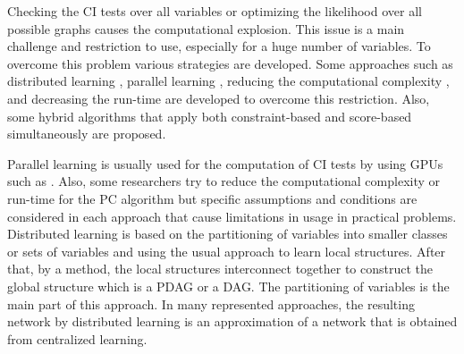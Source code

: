 \documentclass{article}
\newcommand{\Oo}{\mathcal{O}}
\begin{document}
Checking the CI tests over all variables or optimizing the likelihood over all possible graphs causes the computational explosion\cite{2000spirtes}.
This issue is a main challenge and restriction to use, especially for a huge number of variables\cite{2017Janzhing,2017million}.
To overcome this problem various strategies are developed.
Some approaches such as distributed learning \cite{2006Hierarchical,2020PEFdistributed, 2015Classifier}, parallel learning \cite{2019saleh, 2016Li}, reducing the computational complexity \cite{2001Cheng, 2020polynomial, 2019chen}, and decreasing the run-time \cite{2019Reduced, 2022Dual, 2022TimePC} are developed to overcome this restriction.
Also, some hybrid algorithms that apply both constraint-based and score-based simultaneously are proposed.

Parallel learning is usually used for the computation of CI tests by using GPUs such as \cite{2023saleh}. 
Also, some researchers try to reduce the computational complexity or run-time for the PC algorithm but specific assumptions and conditions are considered in each approach that cause limitations in usage in practical problems\cite{2019variance,2021wadhwa,2006Chickering}.
Distributed learning is based on the partitioning of variables into smaller classes or sets of variables and using the usual approach to learn local structures\cite{2020pef}.
After that, by a method, the local structures interconnect together to construct the global structure which is a PDAG or a DAG.
The partitioning of variables is the main part of this approach. 
In many represented approaches, the resulting network by distributed learning is an approximation of a network that is obtained from centralized learning\cite{2019local,2015thousands}.





\end{document}
